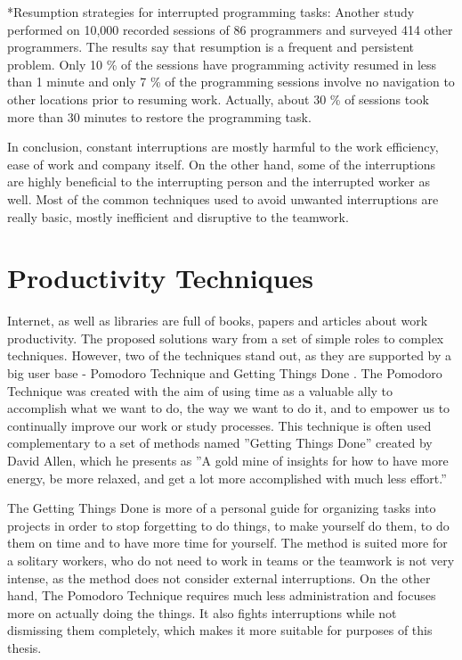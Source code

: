 \documentclass[11pt,singleside]{myfithesis2}
\makeatletter
\renewcommand\paragraph{
   \vspace{-10pt}
   \@startsection{paragraph}{4}{0mm}
      {\baselineskip}
      {- 5pt}
      {\normalfont\normalsize\bfseries}
}
\makeatother
\begin{document}
\paragraph*{Resumption strategies for interrupted programming tasks: } Another study \cite{studyResumptionStrategies} performed on 10,000 recorded sessions of 86 programmers and surveyed 414 other programmers. The results say that resumption is a frequent and persistent problem. Only 10 \% of the sessions have programming activity resumed in less than 1 minute and only 7 \% of the programming sessions involve no navigation to other locations prior to resuming work. Actually, about 30 \% of sessions took more than 30 minutes to restore the programming task.

In conclusion, constant interruptions are mostly harmful to the work efficiency, ease of work and company itself. On the other hand, some of the interruptions are highly beneficial to the interrupting person and the interrupted worker as well. Most of the common techniques used to avoid unwanted interruptions are really basic, mostly inefficient and disruptive to the teamwork.

	\section{Productivity Techniques}
Internet, as well as libraries are full of books, papers and articles about work productivity. The proposed solutions wary from a set of simple roles to complex techniques. However, two of the techniques stand out, as they are supported by a big user base - Pomodoro Technique \cite{pomodoro} and Getting Things Done \cite{gtd}. The Pomodoro Technique was created with the aim of using time as a valuable ally to accomplish what we want to do, the way we want to do it, and to empower us to continually improve our work or study processes. This technique is often used complementary to a set of methods named ''Getting Things Done'' created by David Allen, which he presents as ''A gold mine of insights for how to have more energy, be more relaxed, and get a lot more accomplished with much less effort.''	
	
The Getting Things Done is more of a personal guide for organizing tasks into projects in order to stop forgetting to do things, to make yourself do them, to do them on time and to have more time for yourself. The method is suited more for a solitary workers, who do not need to work in teams or the teamwork is not very intense, as the method does not consider external interruptions. On the other hand, The Pomodoro Technique requires much less administration and focuses more on actually doing the things. It also fights interruptions while not dismissing them completely, which makes it more suitable for purposes of this thesis.
\end{document}
